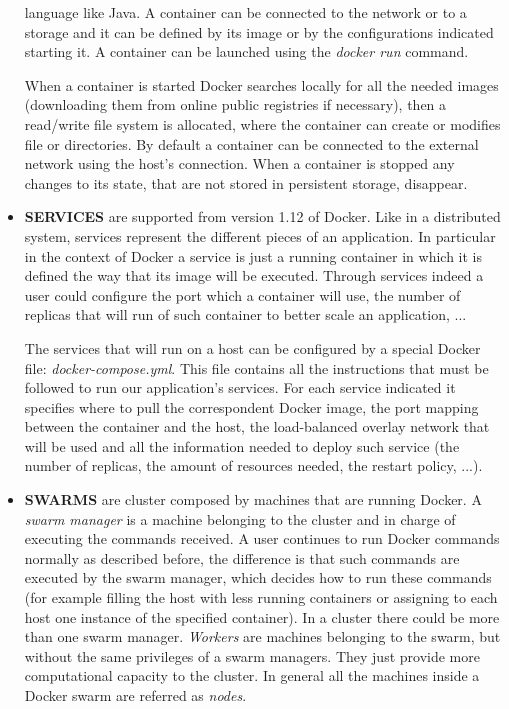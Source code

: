 \documentclass[a4paper,12pt]{article}
\begin{document}
\begin{itemize}
  language like Java. A container can be connected to the network or to a
  storage and it can be defined by its image or by the configurations indicated
  starting it. A container can be launched using the \textit{docker run}
  command.\par When a container is started Docker searches locally for all the
  needed images (downloading them from online public registries if necessary),
  then a read/write file system is allocated, where the container can create or
  modifies file or directories.  By default a container can be connected to the
  external network using the host's connection. When a container is stopped  any
  changes to its state, that are not stored in persistent storage, disappear.
  \item \textbf{SERVICES} are supported from version 1.12 of Docker. Like in a
  distributed system, services represent the different pieces of an application.
  In particular in the context of Docker a service is just a running container
  in which it is defined the way that its image will be executed. Through
  services indeed a user could configure the port which a container will use,
  the number of replicas that will run of such container to better scale an
  application, ... \par The services that will run on a host can be
  configured by a special Docker file: \textit{docker-compose.yml}. This file
  contains all the instructions that must be followed to run our application's
  services. For each service indicated it specifies where to pull the
  correspondent Docker image, the port mapping between the container and the
  host, the load-balanced overlay network that will be used and all the
  information needed to deploy such service (the number of replicas, the amount
  of resources needed, the restart policy, ...).
  \item \textbf{SWARMS} are cluster composed by machines that are running
  Docker. A \textit{swarm manager} is a machine belonging to the cluster and in
  charge of executing the commands received. A user continues to run Docker
  commands normally as described before, the difference is that such commands
  are executed by the swarm manager, which decides how to run these commands
  (for example filling the host with less running containers or assigning to
  each host one instance of the specified container). In a cluster there could
  be more than one swarm manager. \textit{Workers} are machines belonging to the
  swarm, but without the same privileges of a swarm managers. They just provide
  more computational capacity to the cluster. In general all the machines inside
  a Docker swarm are referred as \textit{nodes}.
\end{itemize}
\end{document}
